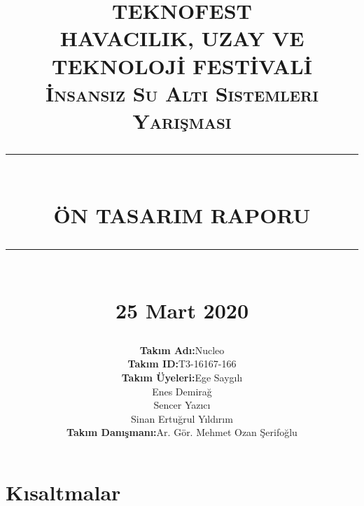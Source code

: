 \documentclass[12pt]{article}
\newcommand{\HRule}[1]{\rule{\linewidth}{#1}}
\begin{document}
\title{\vspace{1cm}
\textsc{\LARGE TEKNOFEST}\\[0.5cm]
\textsc{\large HAVACILIK, UZAY VE TEKNOLOJİ FESTİVALİ}\\[0.5cm]
\textsc{\large İnsansız Su Altı Sistemleri Yarışması}\\[0.5cm]

\HRule{0.5pt} \\[0.4cm]
{\LARGE \bfseries ÖN TASARIM RAPORU}\\[0.3cm]
\HRule{0.5pt} \\[0.5cm]
{\large 25 Mart 2020}\\
\date{}
\author{


\begin{tabular}{l|l}
\textbf{Takım Adı:}       &   Nucleo\\
\textbf{Takım ID:}        &   T3-16167-166\\
\textbf{Takım Üyeleri:}   &   Ege Saygılı\\
                          &   Enes Demirağ\\
                          &   Sencer Yazıcı\\ 
                          &   Sinan Ertuğrul Yıldırım\\
\textbf{Takım Danışmanı:} &   Ar. Gör. Mehmet Ozan Şerifoğlu 
\end{tabular}
}
}
\maketitle
\newpage

\tableofcontents

\newpage
{}
\section*{Kısaltmalar}

\end{document}
